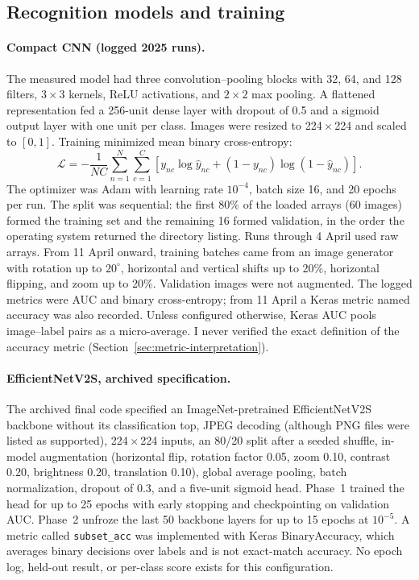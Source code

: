 \documentclass[11pt]{article}
\begin{document}
\subsection{Recognition models and training}
\paragraph{Compact CNN (logged 2025 runs).} The measured model had three convolution--pooling blocks with 32, 64, and 128 filters, $3\times3$ kernels, ReLU activations, and $2\times2$ max pooling. A flattened representation fed a 256-unit dense layer with dropout of 0.5 and a sigmoid output layer with one unit per class. Images were resized to 224\,$\times$\,224 and scaled to $[0,1]$. Training minimized mean binary cross-entropy:
\begin{equation}
\mathcal{L}=-\frac{1}{NC}\sum_{n=1}^{N}\sum_{c=1}^{C}\left[y_{nc}\log\hat{y}_{nc}+(1-y_{nc})\log(1-\hat{y}_{nc})\right].
\label{eq:bce}
\end{equation}
The optimizer was Adam \citep{kingma2015} with learning rate $10^{-4}$, batch size 16, and 20 epochs per run. The split was sequential: the first 80\% of the loaded arrays (60 images) formed the training set and the remaining 16 formed validation, in the order the operating system returned the directory listing. Runs through 4 April used raw arrays. From 11 April onward, training batches came from an image generator with rotation up to $20^\circ$, horizontal and vertical shifts up to 20\%, horizontal flipping, and zoom up to 20\%. Validation images were not augmented. The logged metrics were AUC and binary cross-entropy; from 11 April a Keras metric named accuracy was also recorded. Unless configured otherwise, Keras AUC pools image--label pairs as a micro-average. I never verified the exact definition of the accuracy metric (Section~\ref{sec:metric-interpretation}).

\paragraph{EfficientNetV2S, archived specification.} The archived final code specified an ImageNet-pretrained EfficientNetV2S backbone without its classification top, JPEG decoding (although PNG files were listed as supported), 224\,$\times$\,224 inputs, an 80/20 split after a seeded shuffle, in-model augmentation (horizontal flip, rotation factor 0.05, zoom 0.10, contrast 0.20, brightness 0.20, translation 0.10), global average pooling, batch normalization, dropout of 0.3, and a five-unit sigmoid head. Phase~1 trained the head for up to 25 epochs with early stopping and checkpointing on validation AUC. Phase~2 unfroze the last 50 backbone layers for up to 15 epochs at $10^{-5}$. A metric called \texttt{subset\_acc} was implemented with Keras BinaryAccuracy, which averages binary decisions over labels and is not exact-match accuracy. No epoch log, held-out result, or per-class score exists for this configuration.
\end{document}

